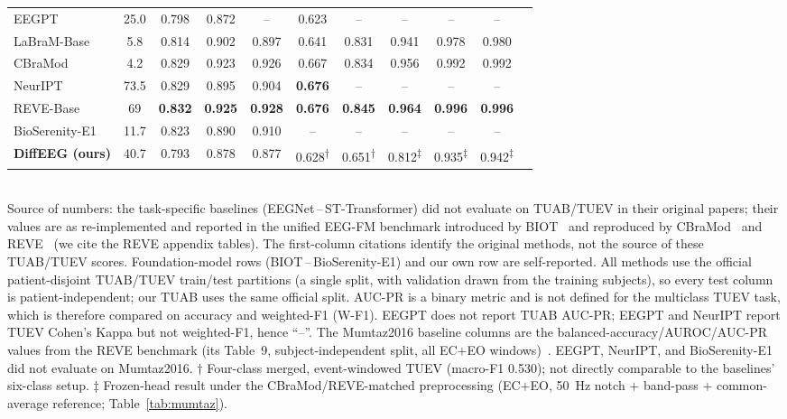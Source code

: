 \documentclass[journal]{IEEEtran}
\newcommand{\best}[1]{\textbf{#1}}
\begin{document}
\begin{table}[t]
\begin{tabular}{@{}lcccccccccc@{}}
EEGPT~\cite{wang2024eegpt}          & 25.0 & 0.798 & 0.872 & -- & 0.623 & -- & -- & -- & -- \\
LaBraM-Base~\cite{jiang2024labram}  & 5.8  & 0.814 & 0.902 & 0.897 & 0.641 & 0.831 & 0.941 & 0.978 & 0.980 \\
CBraMod~\cite{wang2024cbramod}      & 4.2  & 0.829 & 0.923 & 0.926 & 0.667 & 0.834 & 0.956 & 0.992 & 0.992 \\
NeurIPT~\cite{fang2025neuript}      & 73.5 & 0.829 & 0.895 & 0.904 & \best{0.676} & -- & -- & -- & -- \\
REVE-Base~\cite{elouahidi2025reve}  & 69   & \best{0.832} & \best{0.925} & \best{0.928} & \best{0.676} & \best{0.845} & \best{0.964} & \best{0.996} & \best{0.996} \\
BioSerenity-E1~\cite{bettinardi2025bioserenity} & 11.7 & 0.823 & 0.890 & 0.910 & -- & -- & -- & -- & -- \\
\midrule
\textbf{DiffEEG (ours)} & 40.7 & 0.793 & 0.878 & 0.877 & 0.628\textsuperscript{$\dagger$} & 0.651\textsuperscript{$\dagger$} & 0.812\textsuperscript{$\ddagger$} & 0.935\textsuperscript{$\ddagger$} & 0.942\textsuperscript{$\ddagger$} \\
\bottomrule
\end{tabular}
\\[2pt]
{\footnotesize Source of numbers: the task-specific baselines (EEGNet\,--\,ST-Transformer)
did not evaluate on TUAB/TUEV in their original papers; their values are as
re-implemented and reported in the unified EEG-FM benchmark introduced by
BIOT~\cite{yang2024biot} and reproduced by CBraMod~\cite{wang2024cbramod} and
REVE~\cite{elouahidi2025reve} (we cite the REVE appendix tables). The
first-column citations identify the original methods, not the source of
these TUAB/TUEV scores. Foundation-model rows (BIOT\,--\,BioSerenity-E1) and our
own row are self-reported. All methods use the official patient-disjoint
TUAB/TUEV train/test partitions (a single split, with validation drawn from the
training subjects), so every test column is patient-independent; our TUAB uses
the same official split. AUC-PR is a binary metric and is not defined for the
multiclass TUEV task, which is therefore compared on accuracy and weighted-F1
(W-F1). EEGPT does not report TUAB AUC-PR; EEGPT and NeurIPT report TUEV
Cohen's Kappa but not weighted-F1, hence ``--''. The Mumtaz2016 baseline columns
are the balanced-accuracy/AUROC/AUC-PR values from the REVE benchmark (its
Table~9, subject-independent split, all EC$+$EO windows)~\cite{elouahidi2025reve}.
EEGPT, NeurIPT, and BioSerenity-E1 did not evaluate on Mumtaz2016. $\dagger$ Four-class merged,
event-windowed TUEV (macro-F1 \num{0.530}); not directly comparable to the
baselines' six-class setup. $\ddagger$ Frozen-head result under the
CBraMod/REVE-matched preprocessing (EC$+$EO, \SI{50}{\hertz} notch $+$ band-pass
$+$ common-average reference; Table~\ref{tab:mumtaz}).}
\end{table}
\end{document}
